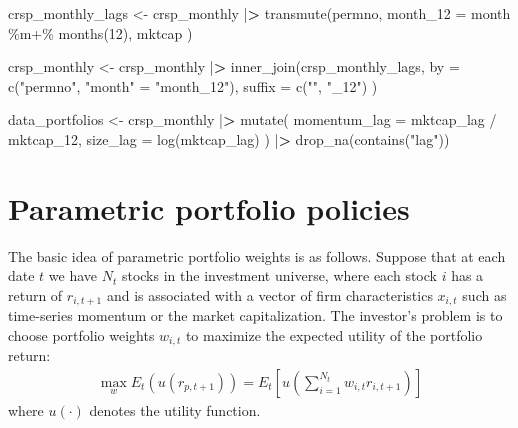 \documentclass[
]{book}
\newenvironment{Shaded}{\begin{snugshade}}{\end{snugshade}}
\newcommand{\AttributeTok}[1]{\textcolor[rgb]{0.61,0.61,0.61}{#1}}
\newcommand{\DecValTok}[1]{\textcolor[rgb]{0.06,0.06,0.06}{#1}}
\newcommand{\ErrorTok}[1]{\textcolor[rgb]{0.14,0.14,0.14}{\textbf{#1}}}
\newcommand{\FunctionTok}[1]{\textcolor[rgb]{0,0,0}{#1}}
\newcommand{\NormalTok}[1]{#1}
\newcommand{\OtherTok}[1]{\textcolor[rgb]{0.37,0.37,0.37}{#1}}
\newcommand{\SpecialCharTok}[1]{\textcolor[rgb]{0,0,0}{#1}}
\newcommand{\StringTok}[1]{\textcolor[rgb]{0.5,0.5,0.5}{#1}}
\begin{document}
\begin{Shaded}
\begin{Highlighting}[]
\NormalTok{crsp\_monthly\_lags }\OtherTok{\textless{}{-}}\NormalTok{ crsp\_monthly }\SpecialCharTok{|}\ErrorTok{\textgreater{}}
  \FunctionTok{transmute}\NormalTok{(permno,}
    \AttributeTok{month\_12 =}\NormalTok{ month }\SpecialCharTok{\%m+\%} \FunctionTok{months}\NormalTok{(}\DecValTok{12}\NormalTok{),}
\NormalTok{    mktcap}
\NormalTok{  )}

\NormalTok{crsp\_monthly }\OtherTok{\textless{}{-}}\NormalTok{ crsp\_monthly }\SpecialCharTok{|}\ErrorTok{\textgreater{}}
  \FunctionTok{inner\_join}\NormalTok{(crsp\_monthly\_lags,}
    \AttributeTok{by =} \FunctionTok{c}\NormalTok{(}\StringTok{"permno"}\NormalTok{, }\StringTok{"month"} \OtherTok{=} \StringTok{"month\_12"}\NormalTok{),}
    \AttributeTok{suffix =} \FunctionTok{c}\NormalTok{(}\StringTok{""}\NormalTok{, }\StringTok{"\_12"}\NormalTok{)}
\NormalTok{  )}

\NormalTok{data\_portfolios }\OtherTok{\textless{}{-}}\NormalTok{ crsp\_monthly }\SpecialCharTok{|}\ErrorTok{\textgreater{}}
  \FunctionTok{mutate}\NormalTok{(}
    \AttributeTok{momentum\_lag =}\NormalTok{ mktcap\_lag }\SpecialCharTok{/}\NormalTok{ mktcap\_12,}
    \AttributeTok{size\_lag =} \FunctionTok{log}\NormalTok{(mktcap\_lag)}
\NormalTok{  ) }\SpecialCharTok{|}\ErrorTok{\textgreater{}}
  \FunctionTok{drop\_na}\NormalTok{(}\FunctionTok{contains}\NormalTok{(}\StringTok{"lag"}\NormalTok{))}
\end{Highlighting}
\end{Shaded}

\hypertarget{parametric-portfolio-policies-1}{%
\section{Parametric portfolio policies}\label{parametric-portfolio-policies-1}}

The basic idea of parametric portfolio weights is as follows. Suppose that at each date \(t\) we have \(N_t\) stocks in the investment universe, where each stock \(i\) has a return of \(r_{i, t+1}\) and is associated with a vector of firm characteristics \(x_{i, t}\) such as time-series momentum or the market capitalization. The investor's problem is to choose portfolio weights \(w_{i,t}\) to maximize the expected utility of the portfolio return:
\[\begin{aligned}
\max_{w} E_t\left(u(r_{p, t+1})\right) = E_t\left[u\left(\sum\limits_{i=1}^{N_t}w_{i,t}r_{i,t+1}\right)\right]
\end{aligned}\]
where \(u(\cdot)\) denotes the utility function.
\end{document}
